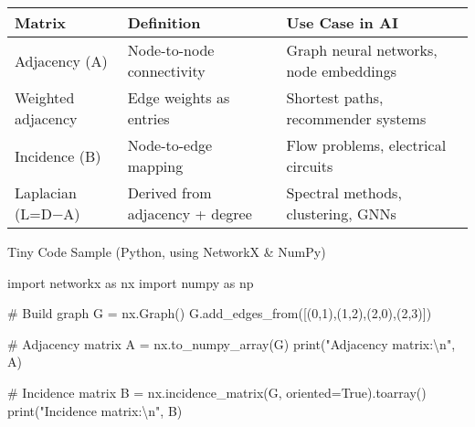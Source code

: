\documentclass[
  letterpaper,
  DIV=11,
  numbers=noendperiod]{scrreprt}
\newenvironment{Shaded}{\begin{snugshade}}{\end{snugshade}}
\newcommand{\BuiltInTok}[1]{\textcolor[rgb]{0.00,0.23,0.31}{#1}}
\newcommand{\CharTok}[1]{\textcolor[rgb]{0.13,0.47,0.30}{#1}}
\newcommand{\CommentTok}[1]{\textcolor[rgb]{0.37,0.37,0.37}{#1}}
\newcommand{\DecValTok}[1]{\textcolor[rgb]{0.68,0.00,0.00}{#1}}
\newcommand{\ImportTok}[1]{\textcolor[rgb]{0.00,0.46,0.62}{#1}}
\newcommand{\NormalTok}[1]{\textcolor[rgb]{0.00,0.23,0.31}{#1}}
\newcommand{\OperatorTok}[1]{\textcolor[rgb]{0.37,0.37,0.37}{#1}}
\newcommand{\StringTok}[1]{\textcolor[rgb]{0.13,0.47,0.30}{#1}}
\newcommand{\VariableTok}[1]{\textcolor[rgb]{0.07,0.07,0.07}{#1}}
\begin{document}
\begin{longtable}[]{@{}
  >{\raggedright\arraybackslash}p{}
  >{\raggedright\arraybackslash}p{}
  >{\raggedright\arraybackslash}p{}@{}}
\toprule\noalign{}
\begin{minipage}[b]{\linewidth}\raggedright
Matrix
\end{minipage} & \begin{minipage}[b]{\linewidth}\raggedright
Definition
\end{minipage} & \begin{minipage}[b]{\linewidth}\raggedright
Use Case in AI
\end{minipage} \\
\midrule\noalign{}
\endhead
\bottomrule\noalign{}
\endlastfoot
Adjacency (A) & Node-to-node connectivity & Graph neural networks, node
embeddings \\
Weighted adjacency & Edge weights as entries & Shortest paths,
recommender systems \\
Incidence (B) & Node-to-edge mapping & Flow problems, electrical
circuits \\
Laplacian (L=D−A) & Derived from adjacency + degree & Spectral methods,
clustering, GNNs \\
\end{longtable}

Tiny Code Sample (Python, using NetworkX \& NumPy)

\begin{Shaded}
\begin{Highlighting}[]
\ImportTok{import}\NormalTok{ networkx }\ImportTok{as}\NormalTok{ nx}
\ImportTok{import}\NormalTok{ numpy }\ImportTok{as}\NormalTok{ np}

\CommentTok{\# Build graph}
\NormalTok{G }\OperatorTok{=}\NormalTok{ nx.Graph()}
\NormalTok{G.add\_edges\_from([(}\DecValTok{0}\NormalTok{,}\DecValTok{1}\NormalTok{),(}\DecValTok{1}\NormalTok{,}\DecValTok{2}\NormalTok{),(}\DecValTok{2}\NormalTok{,}\DecValTok{0}\NormalTok{),(}\DecValTok{2}\NormalTok{,}\DecValTok{3}\NormalTok{)])}

\CommentTok{\# Adjacency matrix}
\NormalTok{A }\OperatorTok{=}\NormalTok{ nx.to\_numpy\_array(G)}
\BuiltInTok{print}\NormalTok{(}\StringTok{"Adjacency matrix:}\CharTok{\textbackslash{}n}\StringTok{"}\NormalTok{, A)}

\CommentTok{\# Incidence matrix}
\NormalTok{B }\OperatorTok{=}\NormalTok{ nx.incidence\_matrix(G, oriented}\OperatorTok{=}\VariableTok{True}\NormalTok{).toarray()}
\BuiltInTok{print}\NormalTok{(}\StringTok{"Incidence matrix:}\CharTok{\textbackslash{}n}\StringTok{"}\NormalTok{, B)}
\end{Highlighting}
\end{Shaded}
\end{document}
